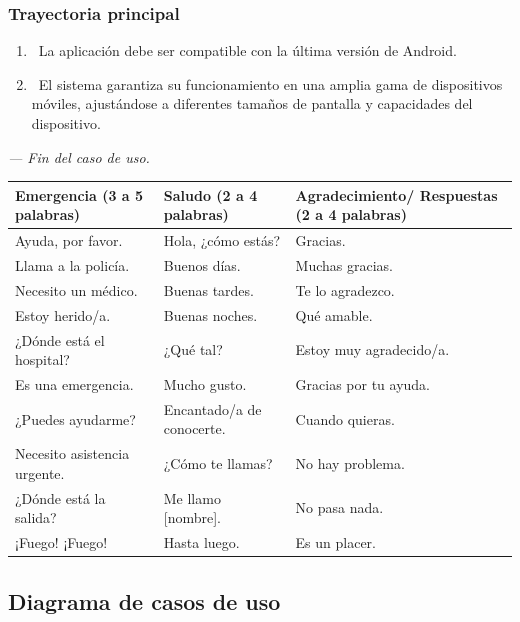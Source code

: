 \subsubsection{Trayectoria principal}
\begin{enumerate}[label=\textbf{\arabic*}, leftmargin=1.5cm]
    \item \UCsystem \ La aplicación debe ser compatible con la última versión de Android.
    
    \item \UCsystem \ El sistema garantiza su funcionamiento en una amplia gama de dispositivos móviles, ajustándose a diferentes tamaños de pantalla y capacidades del dispositivo.

\end{enumerate}

\textit{--- Fin del caso de uso.}

\noindent
\begin{tabularx}{\textwidth}{|X|X|X|}
\hline
\textbf{Emergencia (3 a 5 palabras)} & \textbf{Saludo (2 a 4 palabras)} & \textbf{Agradecimiento/ Respuestas (2 a 4 palabras)} \\ \hline
Ayuda, por favor. & Hola, ¿cómo estás? & Gracias. \\ \hline
Llama a la policía. & Buenos días. & Muchas gracias. \\ \hline
Necesito un médico. & Buenas tardes. & Te lo agradezco. \\ \hline
Estoy herido/a. & Buenas noches. & Qué amable. \\ \hline
¿Dónde está el hospital? & ¿Qué tal? & Estoy muy agradecido/a. \\ \hline
Es una emergencia. & Mucho gusto. & Gracias por tu ayuda. \\ \hline
¿Puedes ayudarme? & Encantado/a de conocerte. & Cuando quieras. \\ \hline
Necesito asistencia urgente. & ¿Cómo te llamas? & No hay problema. \\ \hline
¿Dónde está la salida? & Me llamo [nombre]. & No pasa nada. \\ \hline
¡Fuego! ¡Fuego! & Hasta luego. & Es un placer. \\ \hline
\end{tabularx}


\subsection{Diagrama de casos de uso}
